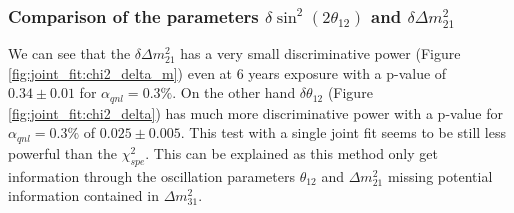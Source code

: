 \documentclass[../main.tex]{subfiles}
\begin{document}
\subsubsection{Comparison of the parameters $\delta \sin^2(2\theta_{12})$ and $\delta \Delta m^2_{21}$}

We can see that the $\delta \Delta m^2_{21}$ has a very small discriminative power (Figure \ref{fig:joint_fit:chi2_delta_m}) even at 6 years exposure with a p-value of $0.34 \pm 0.01$ for $\alpha_{qnl} = 0.3\%$. On the other hand $\delta \theta_{12}$ (Figure \ref{fig:joint_fit:chi2_delta}) has much more discriminative power with a p-value for $\alpha_{qnl} = 0.3\%$ of $0.025 \pm 0.005$. This test with a single joint fit seems to be still less powerful than the $\chi^2_{spe}$. This can be explained as this method only get information through the oscillation parameters $\theta_{12}$ and $\Delta m^2_{21}$ missing potential information contained in $\Delta m^2_{31}$.
\end{document}
